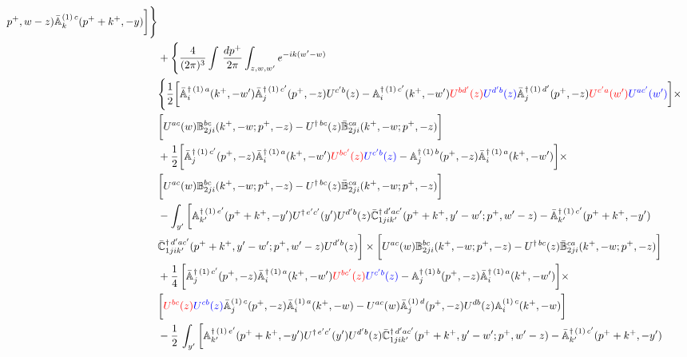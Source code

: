 \documentclass[10pt]{article}
\def\mf#1{\mathbb{#1}}
\numberwithin{equation}{section}
\begin{document}
\begin{align}
p^{+},w-z)\Bar{\mf{A}}^{(1)\,c}_{k}(p^{+}+k^{+},-y)\bigg] \Bigg\}\notag \\ & + \Bigg\{\frac{4}{(2\pi)^{3}} \int\, \frac{dp^{+}}{2\pi}\int_{z,w,w^{\prime}} e^{-ik(w^{\prime}-w)} \notag \\ & 
        \Bigg\{\frac{1}{2}\bigg[\Bar{\mf{A}}^{\dagger\, (1)\, a}_{i}(k^{+},-w^{\prime})\Bar{\mf{A}}^{\dagger\, (1)\, c^{\prime}}_{j}(p^{+},-z)U^{c^{\prime}b}(z)-\mf{A}^{\dagger\, (1)\, c^{\prime}}_{i}(k^{+},- w^{\prime})\textcolor{red}{U^{bd^{\prime}}(z)}\textcolor{blue}{U^{d^{\prime}b}(z)}\Bar{\mf{A}}^{\dagger\, (1)\, d^{\prime}}_{j}(p^{+},-z)\textcolor{red}{U^{c^{\prime}a}(w^{\prime})}\textcolor{blue}{U^{ac^{\prime}}(w^{\prime})}  \bigg]\times\notag \\ & \bigg[U^{ac}(w) \mf{B}^{bc}_{2ji}(k^{+},-w;p^{+},-z) -U^{\dagger\, bc}(z)\Bar{\mf{B}}^{ca}_{2ji}(k^{+},-w; p^{+},-z)\bigg]\notag \\ & +\frac{1}{2}\bigg[\Bar{\mf{A}}^{\dagger\,(1)\, c^{\prime}}_{j}(p^{+},-z)\Bar{\mf{A}}^{\dagger\, (1)\, a}_{i}(k^{+},- w^{\prime})\textcolor{red}{U^{bc^{\prime}}(z)}\textcolor{blue}{U^{c^{\prime}b}(z)} - \mf{A}^{\dagger\, (1)\, b}_{j}(p^{+},- z)\Bar{\mf{A}}^{\dagger\, (1)\, a}_{i}(k^{+},- w^{\prime})\bigg] \times \notag \\ & \bigg[U^{ac}(w) \mf{B}^{bc}_{2ji}(k^{+},-w;p^{+},-z) -U^{\dagger\, bc}(z)\Bar{\mf{B}}^{ca}_{2ji}(k^{+},-w; p^{+},-z)\bigg]\notag \\ & -\int_{y^{\prime}}\bigg[\mf{A}^{\dagger\, (1)\,e^{\prime}}_{k^{\prime}}(p^{+}+k^{+},-y^{\prime})U^{\dagger\, e^{\prime}c^{\prime}}(y^{\prime})U^{d^{\prime}b}(z) \Bar{\mf{C}}^{\dagger\, d^{\prime}ac^{\prime}}_{1jik^{\prime}}(p^{+}+k^{+},y^{\prime}-w^{\prime}; p^{+},w^{\prime}-z)  -\Bar{\mf{A}}^{\dagger\, (1)\,c^{\prime}}_{k^{\prime}}(p^{+}+k^{+},-y^{\prime})\notag \\ & \Bar{\mf{C}}^{\dagger\, d^{\prime}ac^{\prime}}_{1jik^{\prime}}(p^{+}+k^{+},y^{\prime}-w^{\prime}; p^{+},w^{\prime}-z)U^{d^{\prime}b}(z)\bigg] \times \bigg[U^{ac}(w) \mf{B}^{bc}_{2ji}(k^{+},-w;p^{+},-z) -U^{\dagger\, bc}(z)\Bar{\mf{B}}^{ca}_{2ji}(k^{+},-w; p^{+},-z)\bigg]\notag \\ & +\frac{1}{4}\,\bigg[\Bar{\mf{A}}^{\dagger\,(1)\, c^{\prime}}_{j}(p^{+},-z)\Bar{\mf{A}}^{\dagger\, (1)\, a}_{i}(k^{+},- w^{\prime})\textcolor{red}{U^{bc^{\prime}}(z)}\textcolor{blue}{U^{c^{\prime}b}(z)} - \mf{A}^{\dagger\, (1)\, b}_{j}(p^{+},- z)\Bar{\mf{A}}^{\dagger\, (1)\, a}_{i}(k^{+},- w^{\prime})\bigg]\times\notag \\ &  \bigg[\textcolor{red}{U^{bc}(z)}\textcolor{blue}{U^{cb}(z)}\Bar{\mf{A}}^{(1)\, c}_{j}(p^{+},-z)\Bar{\mf{A}}^{(1)\, a}_{i}(k^{+},-w)-U^{ac}(w) \Bar{\mf{A}}^{(1)\, d}_{j}(p^{+},-z)U^{db}(z) \mf{A}^{(1)\, c}_{i}(k^{+},- w)\bigg]\notag \\ & -\frac{1}{2}\, \int_{y^{\prime}}\bigg[\mf{A}^{\dagger\, (1)\,e^{\prime}}_{k^{\prime}}(p^{+}+k^{+},-y^{\prime})U^{\dagger\, e^{\prime}c^{\prime}}(y^{\prime})U^{d^{\prime}b}(z) \Bar{\mf{C}}^{\dagger\, d^{\prime}ac^{\prime}}_{1jik^{\prime}}(p^{+}+k^{+},y^{\prime}-w^{\prime}; p^{+},w^{\prime}-z)  -\Bar{\mf{A}}^{\dagger\, (1)\,c^{\prime}}_{k^{\prime}}(p^{+}+k^{+},-y^{\prime})\notag \\ 
\end{align}
\end{document}
